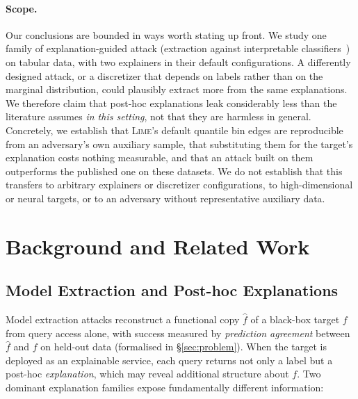 \documentclass[sigconf,anonymous,review]{acmart}
\begin{document}
\paragraph{Scope.} Our conclusions are bounded in ways worth stating up front. We study one family of explanation-guided attack (extraction against interpretable
classifiers~\cite{oksuz2024autolycus}) on tabular data, with two explainers in their default
configurations. A differently designed attack, or a discretizer that depends on labels rather than on
the marginal distribution, could plausibly extract more from the same explanations. We therefore claim
that post-hoc explanations leak considerably less than the literature assumes \emph{in this setting},
not that they are harmless in general. Concretely, we establish that \textsc{Lime}'s default quantile
bin edges are reproducible from an adversary's own auxiliary sample, that substituting them for the
target's explanation costs nothing measurable, and that an attack built on them outperforms the
published one on these datasets. We do not establish that this transfers to arbitrary explainers or
discretizer configurations, to high-dimensional or neural targets, or to an adversary without
representative auxiliary data.

\section{Background and Related Work}
\label{sec:background}

\subsection{Model Extraction and Post-hoc Explanations}
\label{subsec:prelim}

Model extraction attacks reconstruct a functional copy $\hat{f}$ of a black-box
target $f$ from query access alone, with success measured by \emph{prediction
agreement} between $\hat{f}$ and $f$ on held-out data (formalised in
\S\ref{sec:problem}). When the target is deployed as an explainable service, each
query returns not only a label but a post-hoc \emph{explanation}, which may reveal
additional structure about $f$. Two dominant explanation families expose
fundamentally different information:
\end{document}
